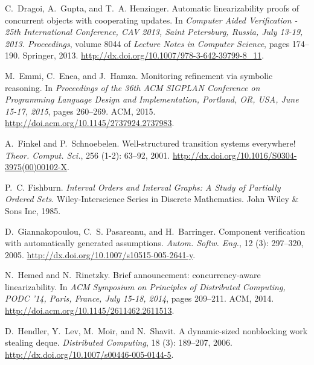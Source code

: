 \documentclass[9pt,natbib,authoryear]{sigplanconf}
\begin{document}
\begin{thebibliography}{26}
C.~Dragoi, A.~Gupta, and T.~A. Henzinger.
\newblock Automatic linearizability proofs of concurrent objects with
  cooperating updates.
\newblock In \emph{Computer Aided Verification - 25th International Conference,
  {CAV} 2013, Saint Petersburg, Russia, July 13-19, 2013. Proceedings}, volume
  8044 of \emph{Lecture Notes in Computer Science}, pages 174--190. Springer,
  2013.
\newblock \url{http://dx.doi.org/10.1007/978-3-642-39799-8_11}.

M.~Emmi, C.~Enea, and J.~Hamza.
\newblock Monitoring refinement via symbolic reasoning.
\newblock In \emph{Proceedings of the 36th {ACM} {SIGPLAN} Conference on
  Programming Language Design and Implementation, Portland, OR, USA, June
  15-17, 2015}, pages 260--269. {ACM}, 2015.
\newblock \url{http://doi.acm.org/10.1145/2737924.2737983}.

A.~Finkel and P.~Schnoebelen.
\newblock Well-structured transition systems everywhere!
\newblock \emph{Theor. Comput. Sci.}, 256 (1-2): 63--92,
  2001.
\newblock \url{http://dx.doi.org/10.1016/S0304-3975(00)00102-X}.

P.~C. Fishburn.
\newblock \emph{Interval Orders and Interval Graphs: A Study of Partially
  Ordered Sets}.
\newblock Wiley-Interscience Series in Discrete Mathematics. John Wiley \& Sons
  Inc, 1985.

D.~Giannakopoulou, C.~S. Pasareanu, and H.~Barringer.
\newblock Component verification with automatically generated assumptions.
\newblock \emph{Autom. Softw. Eng.}, 12 (3): 297--320, 2005.
\newblock \url{http://dx.doi.org/10.1007/s10515-005-2641-y}.

N.~Hemed and N.~Rinetzky.
\newblock Brief announcement: concurrency-aware linearizability.
\newblock In \emph{{ACM} Symposium on Principles of Distributed Computing,
  {PODC} '14, Paris, France, July 15-18, 2014}, pages 209--211. {ACM}, 2014.
\newblock \url{http://doi.acm.org/10.1145/2611462.2611513}.

D.~Hendler, Y.~Lev, M.~Moir, and N.~Shavit.
\newblock A dynamic-sized nonblocking work stealing deque.
\newblock \emph{Distributed Computing}, 18 (3): 189--207,
  2006.
\newblock \url{http://dx.doi.org/10.1007/s00446-005-0144-5}.


\end{thebibliography}
\end{document}
